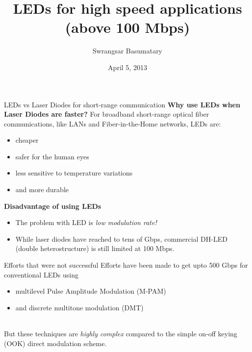 \documentclass[mathserif]{beamer}
\title{LEDs for high speed applications \\ (above 100 Mbps)}
\author{Swrangsar Basumatary}
\institute{IIT Bombay, Powai}
\date{April 5, 2013}
\begin{document}
    \frame{\titlepage}
    
    \begin{frame}{LEDs vs Laser Diodes for short-range communication}
	    \pause
	    \textbf{Why use LEDs when Laser Diodes are faster?}
            \pause For broadband short-range optical fiber communications, like
LANs and Fiber-in-the-Home networks, LEDs are:
            \pause
            \begin{itemize}[<+->]
                \item cheaper
                \item safer for the human eyes
                \item less sensitive to temperature variations
                \item and more durable
            \end{itemize}
  
        \pause
        \textbf{Disadvantage of using LEDs}
            \begin{itemize}
                \pause \item The problem with LED is \pause \emph{low modulation rate!}\\
                \pause \item While laser diodes have reached to tens of Gbps, \pause 
                commercial DH-LED (double heterostructure) is still limited at 100 Mbps.
            \end{itemize}
        
    \end{frame}
    
    \begin{frame}{Efforts that were not successful}
        \pause
        Efforts have been made to get upto 500 Gbps for conventional LEDs using
        \begin{itemize}
            \pause \item multilevel Pulse Amplitude Modulation (M-PAM)
            \pause \item and discrete multitone modulation (DMT) \\~\\
        \end{itemize} 
        
        \pause But these techniques are \emph{highly complex} compared to the simple on-off keying (OOK) direct modulation scheme.
    \end{frame}
    
    
    
\end{document}

